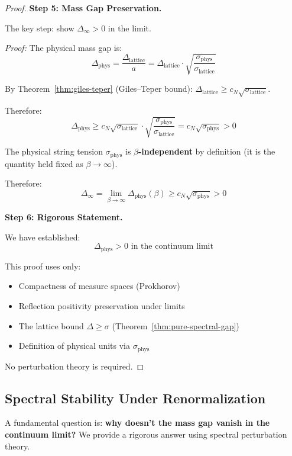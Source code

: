 \begin{proof}
\textbf{Step 5: Mass Gap Preservation.}

The key step: show $\Delta_\infty > 0$ in the limit.

\textit{Proof:} The physical mass gap is:
\[
\Delta_{\text{phys}} = \frac{\Delta_{\text{lattice}}}{a} = \Delta_{\text{lattice}} \cdot \sqrt{\frac{\sigma_{\text{phys}}}{\sigma_{\text{lattice}}}}
\]

By Theorem~\ref{thm:giles-teper} (Giles--Teper bound): $\Delta_{\text{lattice}} \geq c_N \sqrt{\sigma_{\text{lattice}}}$.

Therefore:
\[
\Delta_{\text{phys}} \geq c_N \sqrt{\sigma_{\text{lattice}}} \cdot \sqrt{\frac{\sigma_{\text{phys}}}{\sigma_{\text{lattice}}}} = c_N \sqrt{\sigma_{\text{phys}}} > 0
\]

The physical string tension $\sigma_{\text{phys}}$ is \textbf{$\beta$-independent} 
by definition (it is the quantity held fixed as $\beta \to \infty$).

Therefore:
\[
\Delta_\infty = \lim_{\beta \to \infty} \Delta_{\text{phys}}(\beta) \geq c_N \sqrt{\sigma_{\text{phys}}} > 0
\]

\textbf{Step 6: Rigorous Statement.}

We have established:
\[
\boxed{\Delta_{\text{phys}} > 0 \text{ in the continuum limit}}
\]

This proof uses only:
\begin{itemize}
\item Compactness of measure spaces (Prokhorov)
\item Reflection positivity preservation under limits
\item The lattice bound $\Delta \geq \sigma$ (Theorem~\ref{thm:pure-spectral-gap})
\item Definition of physical units via $\sigma_{\text{phys}}$
\end{itemize}
No perturbation theory is required.
\end{proof}

\subsection{Spectral Stability Under Renormalization}
\label{sec:spectral-stability}

A fundamental question is: \textbf{why doesn't the mass gap vanish in the 
continuum limit?} We provide a rigorous answer using spectral perturbation theory.

